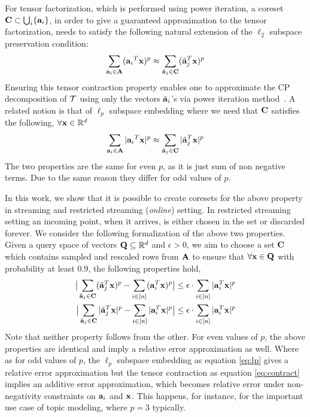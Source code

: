For tensor factorization, which is performed using power iteration, a coreset $\mathbf{C} \subset \bigcup_{i}\{\mathbf{a}_{i}\}$, in order to give a guaranteed approximation to the tensor factorization, needs to satisfy the following natural extension of the $\ell_2$ subspace preservation condition:
\begin{align*}
\sum_{\mathbf{a}_{i} \in \mathbf{A}}({\mathbf{a}_{i}}^T \mathbf{x})^p \approx \sum_{\tilde{\mathbf{a}}_{j} \in \mathbf{C}}({\tilde{\mathbf{a}}_{j}}^T \mathbf{x})^p
\end{align*}
 Ensuring this tensor contraction property enables one to approximate the CP decomposition of $\mathbf{\mathcal{T}}$ using only the vectors $\tilde{\mathbf{a}}_{i}$'s via power iteration method~\cite{anandkumar2014tensor}. A related notion is that of $\ell_p$ subspace embedding where we need that $\mathbf{C}$ satisfies the following, $\forall \mathbf{x}\in \mathbb{R}^{d}$
\begin{align*}
\sum_{\mathbf{a}_{i} \in \mathbf{A}}|{\mathbf{a}_{i}}^T \mathbf{x}|^p \approx \sum_{\tilde{\mathbf{a}}_{j} \in \mathbf{C}}|{\tilde{\mathbf{a}}_{j}}^T \mathbf{x}|^p
\end{align*}
The two properties are the same for even $p$, as it is just sum of non negative terms. Due to the same reason they differ for odd values of $p$.

In this work, we show that it is possible to create coresets for the above property in streaming and restricted streaming ({\em online}) setting. In restricted streaming setting an incoming point, when it arrives, is either chosen in the set or discarded forever. We consider the following formalization of the above two properties. Given a query space of vectors $\mathbf{Q}\subseteq \mathbb{R}^{d}$ and $\epsilon > 0$, we aim to choose a set $\mathbf{C}$ which contains sampled and rescaled rows from $\mathbf{A}$ to ensure that $\forall \mathbf{x} \in \mathbf{Q}$ with probability at least $0.9$, the following properties hold,
\begin{align}
    \big|\sum_{\tilde{\mathbf{a}}_{j} \in \mathbf{C}}(\tilde{\mathbf{a}}_{j}^T\mathbf{x})^p - \sum_{i \in [n]}(\mathbf{a}_{i}^T \mathbf{x})^p\big| \leq \epsilon \cdot \sum_{i \in [n]}|\mathbf{a}_{i}^T \mathbf{x}|^p  \label{eq:contract} \\
    \big|\sum_{\tilde{\mathbf{a}}_{j} \in \mathbf{C}}|\tilde{\mathbf{a}}_{j}^T\mathbf{x}|^p - \sum_{i \in [n]}|\mathbf{a}_{i}^T \mathbf{x}|^p\big| \leq \epsilon \cdot \sum_{i \in [n]}|\mathbf{a}_{i}^T \mathbf{x}|^p  \label{eq:lp}
\end{align}
Note that neither property follows from the other. For even values of $p$, the above properties are identical and imply a relative error approximation as well. Where as for odd values of $p$, the $\ell_{p}$ subspace embedding as equation \eqref{eq:lp} gives a relative error approximation but the tensor contraction as equation \eqref{eq:contract} implies an additive error approximation, which becomes relative error under non-negativity constraints on $\mathbf{a}_{i}$ and $\mathbf{x}$. This happens, for instance, for the important use case of topic modeling, where $p=3$ typically.
% 
